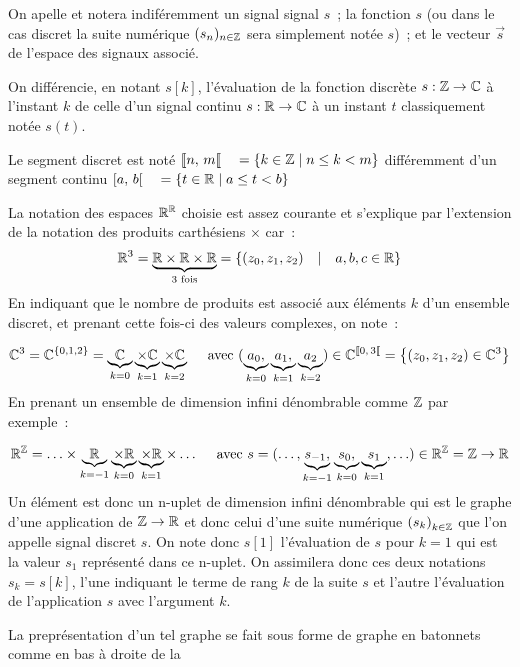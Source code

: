 \begin{remarque}
  On apelle et notera indiféremment un signal signal $s$~; la fonction
  $s$ (ou dans le cas discret la suite numérique $(s_n)_{n\in\mathbb{Z}}$ sera
  simplement notée $s$)~; et le vecteur $\vec{s}$ de l'espace des
  signaux associé.

  On différencie, en notant $s[k]$, l'évaluation de la fonction
  discrète $s: \mathbb{Z}\to\mathbb{C}$ à l'instant $k$ de celle d'un signal continu
  $s: \mathbb{R}\to\mathbb{C}$ à un instant $t$ classiquement notée $s(t)$.
  
  Le segment discret est noté ${[\![ n,\,m[\![} \quad =\left\{k \in\mathbb{Z} \;|\; n\leq k < m\right\}$ différemment d'un segment continu ${\left[ a,\,b \right[} \quad =\left\{t\in\mathbb{R} \;|\; a\leq t < b\right\}$

  La notation des espaces $\mathbb{R}^{\mathbb{R}}$ choisie est assez courante et
  s'explique par l'extension de la notation des produits carthésiens
  $\times$ car~:
  $$ \mathbb{R}^3 = \underbrace{\mathbb{R}\times\mathbb{R}\times\mathbb{R}}_{\text{3 fois}} = \left\{ (z_0, z_1, z_2) \quad|\quad a,b,c \in \mathbb{R} \right\}$$
  En indiquant que le nombre de produits est associé aux éléments $k$ d'un ensemble discret, et prenant cette fois-ci des valeurs complexes, on note~:
  
  $$ \mathbb{C}^3 = \mathbb{C}^{\left\{0, 1, 2\right\}} = \underbrace{\mathbb{C}}_{k=0}\underbrace{\times\mathbb{C}}_{k=1}\underbrace{\times\mathbb{C}}_{k=2} \quad\text{ avec } (\underbrace{a_0, }_{k=0}\underbrace{a_1, }_{k=1}\underbrace{a_2}_{k=2}) \in  \mathbb{C}^{{[\![ 0,\,3[\![}} = \left\{ (z_0, z_1, z_2) \in \mathbb{C}^3 \right\}$$
  En prenant un ensemble de dimension infini dénombrable comme $\mathbb{Z}$  par exemple~:

  $$ \mathbb{R}^{\mathbb{Z}} = \ldots \times \underbrace{\mathbb{R}}_{k=-1} \underbrace{\times\mathbb{R}}_{k=0} \underbrace{\times\mathbb{R}}_{k=1} \times \ldots \quad\text{ avec } s=(\ldots, \underbrace{s_{-1}, }_{k=-1}\underbrace{s_0, }_{k=0}\underbrace{s_1}_{k=1}, \ldots) \in  \mathbb{R}^{\mathbb{Z}}= \mathbb{Z}\to\mathbb{R}$$
  Un élément est donc un n-uplet de dimension infini dénombrable qui
  est le graphe d'une application de $\mathbb{Z}\to\mathbb{R}$ et donc celui d'une
  suite numérique $\left(s_k\right)_{k\in\mathbb{Z}}$ que l'on appelle signal
  discret $s$. On note donc $s[1]$ l'évaluation de $s$ pour $k=1$ qui
  est la valeur $s_1$ représenté dans ce n-uplet. On assimilera donc
  ces deux notations $s_k=s[k]$, l'une indiquant le terme de rang $k$
  de la suite $s$ et l'autre l'évaluation de l'application $s$ avec
  l'argument $k$.

  La preprésentation d'un tel graphe se fait sous forme de graphe en
  \og{} batonnets\fg{} comme en bas à droite de la


\end{remarque}
